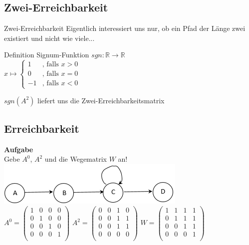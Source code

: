 \subsection{Zwei-Erreichbarkeit}
\begin{frame}{Zwei-Erreichbarkeit}
	Eigentlich interessiert uns nur, ob ein Pfad der Länge zwei existiert und nicht wie viele...
	\pause
	\begin{block}{Definition Signum-Funktion}
		$sgn: \mathbb{R}\rightarrow \mathbb{R}$\\
		$x \mapsto \begin{cases}
		1& \text{, falls } x > 0\\
		0 & \text{, falls } x = 0\\
		-1& \text{, falls } x < 0
		\end{cases}$
	\end{block}
	\pause
	$sgn(A^2)$ liefert uns die Zwei-Erreichbarkeitsmatrix
\end{frame}

\subsection{Erreichbarkeit}
\begin{frame}
	\textbf{Aufgabe}\\
	Gebe $A^0$, $A^2$ und die Wegematrix $W$ an!
	\includegraphics[scale=0.6]{images/Graph3.png}\\
	\pause
	$ A^0 =
	\begin{pmatrix}
	1&0&0&0\\
	0&1&0&0\\
	0&0&1&0\\
	0&0&0&1\\
	\end{pmatrix}	
	$ \pause
	$ A^2 =
	\begin{pmatrix}
	0&0&1&0\\
	0&0&1&1\\
	0&0&1&1\\
	0&0&0&0\\
	\end{pmatrix}	
	$ \pause
	$ W =
	\begin{pmatrix}
	1&1&1&1\\
	0&1&1&1\\
	0&0&1&1\\
	0&0&0&1\\
	\end{pmatrix}	
	$ 
	
\end{frame}

